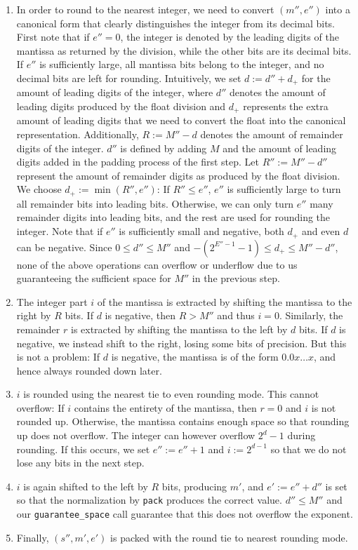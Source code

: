 \documentclass[a4paper,UKenglish,cleveref, autoref, thm-restate]{lipics-v2019}
\begin{document}
\begin{enumerate}
	\item In order to round to the nearest integer, we need to convert $(m'', e'')$ into a canonical form that clearly distinguishes the integer from its decimal bits. First note that if $e'' = 0$, the integer is denoted by the leading digits of the mantissa as returned by the division, while the other bits are its decimal bits. If $e''$ is sufficiently large, all mantissa bits belong to the integer, and no decimal bits are left for rounding. Intuitively, we set $d := d'' + d_+$ for the amount of leading digits of the integer, where $d''$ denotes the amount of leading digits produced by the float division and $d_+$ represents the extra amount of leading digits that we need to convert the float into the canonical representation. Additionally, $R := M'' - d$ denotes the amount of remainder digits of the integer. $d''$ is defined by adding $M$ and the amount of leading digits added in the padding process of the first step. Let $R'' := M'' - d''$ represent the amount of remainder digits as produced by the float division. We choose $d_+ := \min(R'', e'')$: If $R'' \leq e''$, $e''$ is sufficiently large to turn all remainder bits into leading bits. Otherwise, we can only turn $e''$ many remainder digits into leading bits, and the rest are used for rounding the integer. Note that if $e''$ is sufficiently small and negative, both $d_+$ and even $d$ can be negative. Since $0 \leq d'' \leq M''$ and $-(2^{E''-1}-1) \leq d_+ \leq M'' - d''$, none of the above operations can overflow or underflow due to us guaranteeing the sufficient space for $M''$ in the previous step.
	\item The integer part $i$ of the mantissa is extracted by shifting the mantissa to the right by $R$ bits. If $d$ is negative, then $R > M''$ and thus $i = 0$. Similarly, the remainder $r$ is extracted by shifting the mantissa to the left by $d$ bits. If $d$ is negative, we instead shift to the right, losing some bits of precision. But this is not a problem: If $d$ is negative, the mantissa is of the form $0.0x \dots x$, and hence always rounded down later. 
	\item $i$ is rounded using the nearest tie to even rounding mode. This cannot overflow: If $i$ contains the entirety of the mantissa, then $r = 0$ and $i$ is not rounded up. Otherwise, the mantissa contains enough space so that rounding up does not overflow. The integer can however overflow $2^d - 1$ during rounding. If this occurs, we set $e'' := e'' + 1$ and $i := 2^{d-1}$ so that we do not lose any bits in the next step.
	\item $i$ is again shifted to the left by $R$ bits, producing $m'$, and $e' := e'' + d''$ is set so that the normalization by \verb|pack| produces the correct value. $d'' \leq M''$ and our \verb|guarantee_space| call guarantee that this does not overflow the exponent.
	\item Finally, $(s'', m', e')$ is packed with the round tie to nearest rounding mode.
\end{enumerate}
\end{document}
